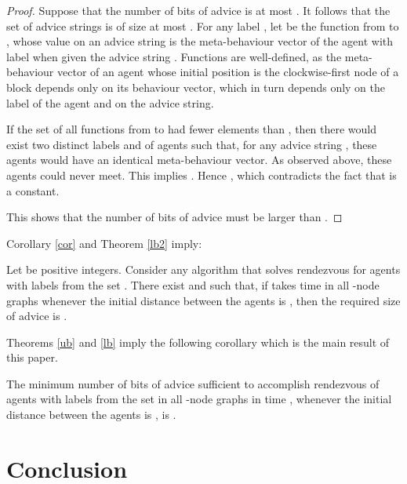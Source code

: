 \documentclass{llncs}
\begin{document}
\begin{proof}
Suppose that the number of bits of advice is at most
. It follows that the set  of advice strings is of size at most . For any label , let 
 be the function from  to , whose value on an advice string  is the meta-behaviour vector of the agent with label  when given the advice string . Functions  are well-defined, as the meta-behaviour vector of an agent whose initial position is the clockwise-first node of a block depends only on its behaviour vector, which in turn depends only on the label of the agent and on the advice string.

 If the set  of all functions from  to  had fewer elements than , then there would exist two distinct labels  and  of agents
 such that, for any advice string , these agents would have an identical meta-behaviour vector. As observed above, these agents could never meet. This implies
 . Hence , which contradicts the fact that  is a constant.
 
 This shows that the number of bits of advice must be larger than .
\end{proof}

Corollary \ref{cor} and  Theorem \ref{lb2} imply:

\begin{theorem}\label{lb}
Let  be positive integers.
Consider any algorithm  that solves rendezvous for agents with labels from the set . 
There exist  and  such that, if  takes time  in all -node graphs
whenever the initial distance between the agents is , then the required size of advice is
.
\end{theorem}

Theorems \ref{ub} and \ref{lb} imply the following corollary which is the main result of this paper.

\begin{corollary}
The minimum number of bits of advice sufficient to accomplish rendezvous of agents with labels from the set  in all -node graphs in time , whenever the initial distance between the agents is , is .
\end{corollary} 





\section{Conclusion}
\end{document}
